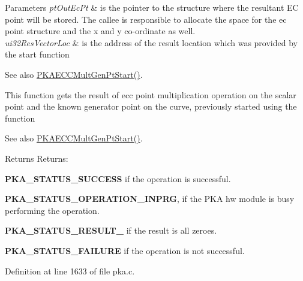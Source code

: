 \begin{DoxyParams}{Parameters}
{\em pt\+Out\+Ec\+Pt} & is the pointer to the structure where the resultant EC point will be stored. The callee is responsible to allocate the space for the ec point structure and the x and y co-\/ordinate as well. \\
\hline
{\em ui32\+Res\+Vector\+Loc} & is the address of the result location which was provided by the start function \\
\hline
\end{DoxyParams}
\begin{DoxySeeAlso}{See also}
\hyperlink{group__pka__driver_ga37519c82259a12764cb68cb265bc09c9}{P\+K\+A\+E\+C\+C\+Mult\+Gen\+Pt\+Start()}.
\end{DoxySeeAlso}
This function gets the result of ecc point multiplication operation on the scalar point and the known generator point on the curve, previously started using the function \begin{DoxySeeAlso}{See also}
\hyperlink{group__pka__driver_ga37519c82259a12764cb68cb265bc09c9}{P\+K\+A\+E\+C\+C\+Mult\+Gen\+Pt\+Start()}.
\end{DoxySeeAlso}
\begin{DoxyReturn}{Returns}
Returns\+:
\begin{DoxyItemize}
\item {\bfseries P\+K\+A\+\_\+\+S\+T\+A\+T\+U\+S\+\_\+\+S\+U\+C\+C\+E\+SS} if the operation is successful.
\item {\bfseries P\+K\+A\+\_\+\+S\+T\+A\+T\+U\+S\+\_\+\+O\+P\+E\+R\+A\+T\+I\+O\+N\+\_\+\+I\+N\+P\+RG}, if the P\+KA hw module is busy performing the operation.
\item {\bfseries P\+K\+A\+\_\+\+S\+T\+A\+T\+U\+S\+\_\+\+R\+E\+S\+U\+L\+T\+\_} if the result is all zeroes.
\item {\bfseries P\+K\+A\+\_\+\+S\+T\+A\+T\+U\+S\+\_\+\+F\+A\+I\+L\+U\+RE} if the operation is not successful. 
\end{DoxyItemize}
\end{DoxyReturn}


Definition at line 1633 of file pka.\+c.

